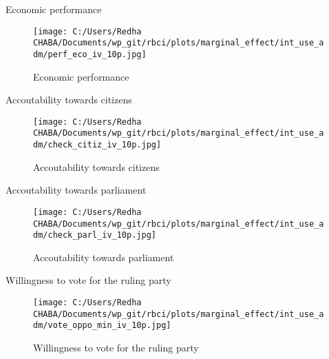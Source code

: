 \documentclass[aspectratio=169,xcolor=dvipsnames]{beamer}
\begin{document}
\begin{frame}[noframenumbering]{Economic performance}
        \begin{figure}
    \centering
    \texttt{[image: C:/Users/Redha CHABA/Documents/wp\_git/rbci/plots/marginal\_effect/int\_use\_adm/perf\_eco\_iv\_10p.jpg]}
    \caption{Economic performance}
\end{figure}
\end{frame}


\begin{frame}[noframenumbering]{Accoutability towards citizens}
        \begin{figure}
    \centering
    \texttt{[image: C:/Users/Redha CHABA/Documents/wp\_git/rbci/plots/marginal\_effect/int\_use\_adm/check\_citiz\_iv\_10p.jpg]}
    \caption{Accoutability towards citizens}
\end{figure}
\end{frame}

\begin{frame}[noframenumbering]{Accoutability towards parliament}
        \begin{figure}
    \centering
    \texttt{[image: C:/Users/Redha CHABA/Documents/wp\_git/rbci/plots/marginal\_effect/int\_use\_adm/check\_parl\_iv\_10p.jpg]}
    \caption{Accoutability towards parliament}
\end{figure}
\end{frame}

\begin{frame}[noframenumbering]{Willingness to vote for the ruling party}
        \begin{figure}
    \centering
    \texttt{[image: C:/Users/Redha CHABA/Documents/wp\_git/rbci/plots/marginal\_effect/int\_use\_adm/vote\_oppo\_min\_iv\_10p.jpg]}
    \caption{Willingness to vote for the ruling party}
\end{figure}
\end{frame}
\end{document}
